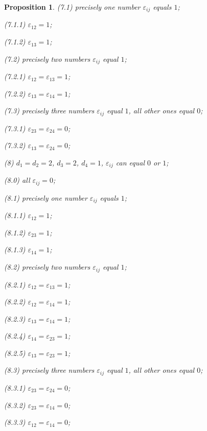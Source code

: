 \documentclass[14pt]{article}
\newtheorem{proposition}{\indent Proposition}[section]
\begin{document}
\begin{proposition}
\hskip 0.5cm (7.1) precisely one number $\varepsilon_{ij}$  equals $1$;

\hskip 1cm (7.1.1)  $\varepsilon_{12} = 1$;

\hskip 1cm (7.1.2)  $\varepsilon_{13} = 1$;

\hskip 0.5cm (7.2) precisely two numbers  $\varepsilon_{ij}$ equal $1$;

\hskip 1cm (7.2.1)  $\varepsilon_{12} = \varepsilon_{13} = 1$;

\hskip 1cm (7.2.2)  $\varepsilon_{13} = \varepsilon_{14} = 1$;

\hskip 0.5cm (7.3) precisely three numbers $\varepsilon_{ij}$ equal $1$, all other
ones  equal  $0$;

\hskip 1cm (7.3.1)  $\varepsilon_{23} = \varepsilon_{24} = 0$;

\hskip 1cm (7.3.2)  $\varepsilon_{13} = \varepsilon_{24} = 0$;

(8) $d_1 = d_2 = 2$, $d_3 = 2$, $d_4 = 1$, $\varepsilon_{ij}$ can  equal  $0$ or $1$;

\hskip 0.5cm (8.0) all $\varepsilon_{ij} = 0$;

\hskip 0.5cm (8.1) precisely one number  $\varepsilon_{ij}$ equals $1$;

\hskip 1cm (8.1.1)  $\varepsilon_{12} = 1$;

\hskip 1cm (8.1.2)  $\varepsilon_{23} = 1$;

\hskip 1cm (8.1.3)  $\varepsilon_{14} = 1$;

\hskip 0.5cm (8.2) precisely two numbers $\varepsilon_{ij}$  equal  $1$;

\hskip 1cm (8.2.1)  $\varepsilon_{12} = \varepsilon_{13} = 1$;

\hskip 1cm (8.2.2)  $\varepsilon_{12} = \varepsilon_{14} = 1$;

\hskip 1cm (8.2.3)  $\varepsilon_{13} = \varepsilon_{14} = 1$;

\hskip 1cm (8.2.4)  $\varepsilon_{14} = \varepsilon_{23} = 1$;

\hskip 1cm (8.2.5)  $\varepsilon_{13} = \varepsilon_{23} = 1$;

\hskip 0.5cm (8.3) precisely three numbers  $\varepsilon_{ij}$  equal $1$,
all other ones equal $0$;

\hskip 1cm (8.3.1)  $\varepsilon_{23} = \varepsilon_{24} = 0$;

\hskip 1cm (8.3.2)  $\varepsilon_{23} = \varepsilon_{14} = 0$;

\hskip 1cm (8.3.3)  $\varepsilon_{12} = \varepsilon_{14} = 0$;


\end{proposition}
\end{document}
